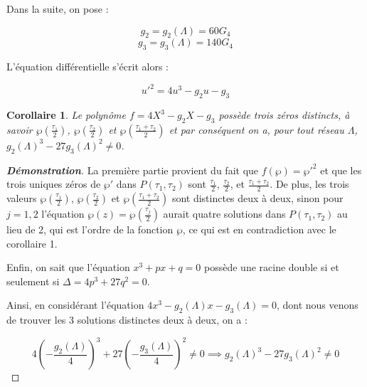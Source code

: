 \documentclass[12pt]{article}
\newtheorem{corollary}{Corollaire}
\begin{document}
                Dans la suite, on pose :

                \[
                g_2 = g_2(\Lambda) = 60G_4
                \]
                \[
                g_3 = g_3(\Lambda) = 140G_4
                \]

                L'équation différentielle s'écrit alors :

                \[
                u'^2 = 4u^3 - g_2u - g_3
                \]

                \begin{corollary}
                    Le polynôme \(f = 4X^3 - g_2X - g_3\) possède trois zéros distincts, à savoir \(\wp\left(\frac{\tau_1}{2}\right)\), \(\wp\left(\frac{\tau_2}{2}\right)\) et \(\wp\left(\frac{\tau_1 + \tau_2}{2}\right)\) et par conséquent on a, pour tout réseau \(\Lambda\), \(g_2(\Lambda)^3 - 27g_3(\Lambda)^2 \neq 0\).
                    \end{corollary}

                    \begin{proof}[\textbf{Démonstration}]
                    La première partie provient du fait que \(f(\wp) = \wp'^2\) et que les trois uniques zéros de \(\wp'\) dans \(P(\tau_1, \tau_2)\) sont
                    \(\frac{\tau_1}{2}\), \(\frac{\tau_2}{2}\), et \(\frac{\tau_1 + \tau_2}{2}\). De plus, les trois valeurs \(\wp\left(\frac{\tau_1}{2}\right)\), \(\wp\left(\frac{\tau_2}{2}\right)\) et \(\wp\left(\frac{\tau_1 + \tau_2}{2}\right)\)
                    sont distinctes deux à deux, sinon pour \(j = 1, 2\) l'équation \(\wp(z) = \wp(\frac{\tau_j}{2})\) aurait quatre solutions dans \(P(\tau_1, \tau_2)\) au lieu de 2,
                    qui est l'ordre de la fonction \(\wp\), ce qui est en contradiction avec le corollaire 1.

                    Enfin, on sait que l'équation \(x^3 + px + q = 0\) possède une racine double si et seulement si \(\Delta = 4p^3 + 27q^2 = 0\).

                    Ainsi, en considérant l'équation \(4x^3 - g_2(\Lambda)x - g_3(\Lambda) = 0\), dont nous venons de trouver les 3 solutions distinctes deux à deux, on a :

                    \[
                    4\left(-\frac{g_2(\Lambda)}{4}\right)^3 + 27\left(-\frac{g_3(\Lambda)}{4}\right)^2 \neq 0 \implies g_2(\Lambda)^3 - 27g_3(\Lambda)^2 \neq 0
                    \]
                    \end{proof}
\end{document}
